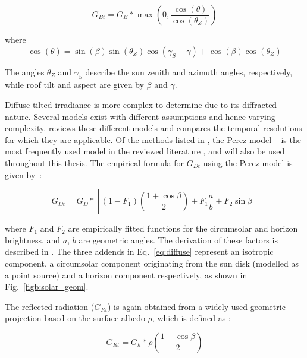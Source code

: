 \begin{equation}
\label{eq:direct}
    G_{Bt} = G_{B} * \max \left( 0, \frac{\cos(\theta)}{\cos(\theta_Z)} \right)
\end{equation}

where
\begin{equation}
\label{eq:dir_angle}
\cos(\theta) = \sin(\beta) \sin(\theta_Z) \cos(\gamma_S - \gamma) + \cos(\beta) \cos(\theta_Z) 
\end{equation}

The angles $\theta_Z$ and $\gamma_S$ describe the sun zenith and azimuth angles, respectively, while roof tilt and aspect are given by $\beta$ and $\gamma$.

Diffuse tilted irradiance is more complex to determine due to its diffracted nature. Several models exist with different assumptions and hence varying complexity. \citet{assouline_estimation_2017} reviews these different models and compares the temporal resolutions for which they are applicable.
Of the methods listed in \citet{assouline_estimation_2017} , the Perez model ~\cite{perez_modeling_1990} is the most frequently used model in the reviewed literature \cite{buffat_scalable_2018,jakubiec_method_2013,mainzer_assessment_2017,wegertseder_combining_2016}, and will also be used throughout this thesis.
The empirical formula for $G_{Dt}$ using the Perez model is given by~\cite{perez_modeling_1990}:

\begin{equation}
\label{eq:diffuse}
G_{Dt} = G_D * \left[ (1 - F_1) \left( \frac{1 + \cos \beta}{2} \right) 
       + F_1 \frac{ a }{ b }
       + F_2 \sin \beta \right]
\end{equation}

where $F_1$ and $F_2$ are empirically fitted functions for the circumsolar and horizon brightness, and $a$, $b$ are geometric angles. The derivation of these factors is described in \cite{loutzenhiser_empirical_2007}. The three addends in Eq.~\ref{eq:diffuse} represent an isotropic component, a circumsolar component originating from the sun disk (modelled as a point source) and a horizon component respectively, as shown in Fig.~\ref{figb:solar_geom}.

The reflected radiation ($G_{Rt}$) is again obtained from a widely used geometric projection based on the surface albedo $\rho$, which is defined as \cite{duffie_solar_2013}:

\begin{equation}
\label{eq:reflected}
G_{Rt} = G_h * \rho \left( \frac{1-\cos \beta}{2} \right)
\end{equation}


